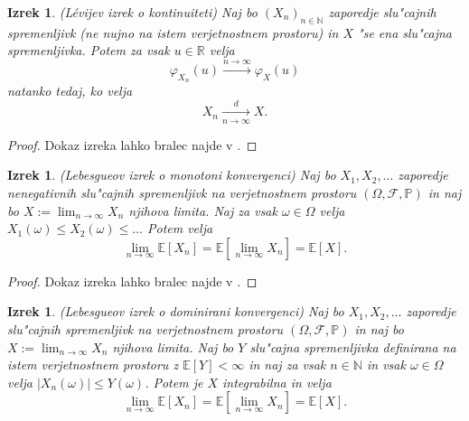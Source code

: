 \documentclass[12pt, a4paper, reqno]{amsart}
\theoremstyle{definition}
\theoremstyle{plain}
\newtheorem{izrek}[definicija]{Izrek}
\newcommand{\R}{\mathbb{R}}
\newcommand{\N}{\mathbb{N}}
\newcommand{\E}{\mathbb{E}}
\newcommand{\Prob}{\mathbb{P}}
\newcommand{\1}{\mathds{1}}
\begin{document}
    \begin{izrek}(Lévijev izrek o kontinuiteti)
        Naj bo $(X_n)_{n\in\N}$ zaporedje slu"cajnih spremenljivk (ne nujno na istem verjetnostnem prostoru)
        in $X$ "se ena slu"cajna spremenljivka. Potem za vsak $u\in\R$ velja
        \begin{equation*}
            \varphi_{X_n}(u) \xrightarrow{n\to\infty} \varphi_X(u) 
        \end{equation*}
        natanko tedaj, ko velja
        \begin{equation*}
            X_n \xrightarrow[n\to\infty]{d} X.
        \end{equation*}
        \label{izr:LevijevIzrek}
    \end{izrek}

    \begin{proof}
        Dokaz izreka lahko bralec najde v \cite{7}.
    \end{proof}

    \begin{izrek}(Lebesgueov izrek o monotoni konvergenci)
        Naj bo $X_1, X_2, \dots $ zaporedje nenegativnih slu"cajnih spremenljivk na 
        verjetnostnem prostoru $(\Omega, \mathcal{F}, \Prob)$ in naj bo $X:= \lim_{n\to\infty}X_n$ 
        njihova limita. Naj za vsak $\omega \in \Omega$
        velja $X_1(\omega) \leq X_2(\omega) \leq \dots$ Potem velja 
        \begin{equation*}
            \lim_{n\to\infty}\E\left[X_n\right] = \E\left[\lim_{n\to\infty}X_n\right] = \E\left[X\right].
        \end{equation*}
        \label{izr:monotonaKonvergenca}
    \end{izrek}

    \begin{proof}
        Dokaz izreka lahko bralec najde v \cite{7}.
    \end{proof}  

    \begin{izrek}(Lebesgueov izrek o dominirani konvergenci)
        Naj bo $X_1, X_2, \dots $ zaporedje slu"cajnih spremenljivk na verjetnostnem prostoru
        $(\Omega, \mathcal{F}, \Prob)$ in naj bo $X:= \lim_{n\to\infty}X_n$ njihova limita.
        Naj bo $Y$ slu"cajna spremenljivka definirana na istem verjetnostnem prostoru z $\E\left[Y\right]<\infty$ in
        naj za vsak $n\in\N$ in vsak $\omega\in\Omega$ velja $|X_n(\omega)| \leq Y(\omega)$. Potem je $X$ integrabilna
        in velja 
        \begin{equation*}
            \lim_{n\to\infty}\E\left[X_n\right] = \E\left[\lim_{n\to\infty}X_n\right] = \E\left[X\right].
        \end{equation*}
        \label{izr:dominiranaKonvergenca}
    \end{izrek}
\end{document}
